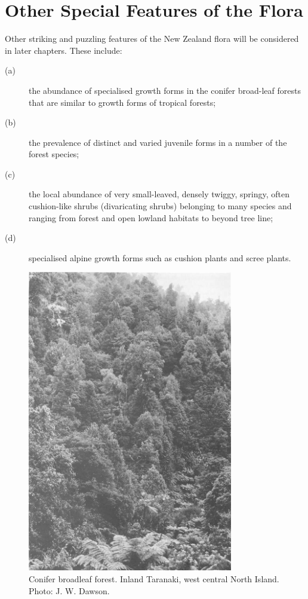 \section{Other Special Features of the Flora}

Other striking and puzzling features of the New Zealand flora will be considered in later chapters.
These include:

\begin{description}
\item[{(a)}]the abundance of specialised growth forms in the conifer broad-leaf forests that are similar to growth forms of tropical forests;
\item[{(b)}]the prevalence of distinct and varied juvenile forms in a number of the forest species;
\item[{(c)}]the local abundance of very small-leaved, densely twiggy, springy, often cushion-like shrubs (divaricating shrubs) belonging to many species and ranging from forest and open lowland habitats to beyond tree line;
\item[{(d)}]specialised alpine growth forms such as cushion plants and scree plants.
\end{description}

\cleartoleftpage%
\begin{figure}[htb]
	\centering
	\includegraphics[width=0.8\textwidth]{graphics/figure6conifer-broadleaf.jpg}
	\caption[Conifer broadleaf forest, inland Taranaki]{Conifer broadleaf forest.
    Inland Taranaki, west central North Island.
	Photo: J. W. Dawson.}%
	\label{fig:6conifer-broadleaf}
\end{figure}
